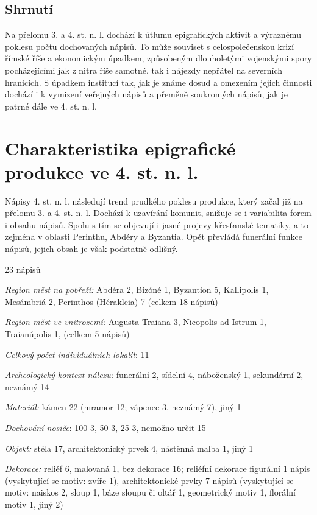 \subsection[shrnutí-20]{Shrnutí}

Na přelomu 3. a 4. st. n. l. dochází k útlumu epigrafických aktivit a výraznému poklesu počtu dochovaných nápisů. To může souviset s celospolečenskou krizí římské říše a ekonomickým úpadkem, způsobeným dlouholetými vojenskými spory pocházejícími jak z nitra říše samotné, tak i nájezdy nepřátel na severních hranicích. S úpadkem institucí tak, jak je známe dosud a omezením jejich činnosti dochází i k vymizení veřejných nápisů a přeměně soukromých nápisů, jak je patrné dále ve 4. st. n. l.

\section[charakteristika-epigrafické-produkce-ve-4.-st.-n.-l.]{Charakteristika epigrafické produkce ve 4. st. n. l.}

Nápisy 4. st. n. l. následují trend prudkého poklesu produkce, který začal již na přelomu 3. a 4. st. n. l. Dochází k uzavírání komunit, snižuje se i variabilita forem i obsahu nápisů. Spolu s tím se objevují i jasné projevy křesťanské tematiky, a to zejména v oblasti Perinthu, Abdéry a Byzantia. Opět převládá funerální funkce nápisů, jejich obsah je však podstatně odlišný.

\placetable[none]{}
\starttable[|l|]
\HL
{} 23 nápisů

{\em Region měst na pobřeží:} Abdéra 2, Bizóné 1, Byzantion 5, Kallipolis 1, Mesámbriá 2, Perinthos (Hérakleia) 7 (celkem 18 nápisů)

{\em Region měst ve vnitrozemí:} Augusta Traiana 3, Nicopolis ad Istrum 1, Traianúpolis 1, (celkem 5 nápisů)

{\em Celkový počet individuálních lokalit}: 11

{\em Archeologický kontext nálezu:} funerální 2, sídelní 4, náboženský 1, sekundární 2, neznámý 14

{\em Materiál:} kámen 22 (mramor 12; vápenec 3, neznámý 7), jiný 1

{\em Dochování nosiče}: 100  3, 50  3, 25  3, nemožno určit 15

{\em Objekt:} stéla 17, architektonický prvek 4, nástěnná malba 1, jiný 1

{\em Dekorace:} reliéf 6, malovaná 1, bez dekorace 16; reliéfní dekorace figurální 1 nápis (vyskytující se motiv: zvíře 1), architektonické prvky 7 nápisů (vyskytující se motiv: naiskos 2, sloup 1, báze sloupu či oltář 1, geometrický motiv 1, florální motiv 1, jiný 2)

